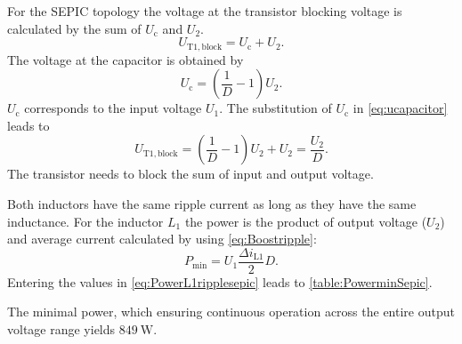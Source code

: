\begin{solutionblock}
    For the SEPIC topology the voltage at the transistor blocking voltage is calculated by the sum of 
    $U_\mathrm{c}$ and $U_\mathrm{2}$.
    \begin{equation}
        U_\mathrm{T1,block}=U_\mathrm{c}+U_\mathrm{2}.
    \end{equation}
    The voltage at the capacitor is obtained by
    \begin{equation}
        U_\mathrm{c}=\left( \frac{1}{D}-1\right) U_\mathrm{2}.
        \label{eq:ucapacitor}        
    \end{equation}
    $U_\mathrm{c}$ corresponds to the input voltage $U_\mathrm{1}$. The substitution of $U_\mathrm{c}$ in \eqref{eq:ucapacitor} leads to 
    \begin{equation}
        U_\mathrm{T1,block}=\left( \frac{1}{D}-1\right) U_\mathrm{2}+U_\mathrm{2}=\frac{U_\mathrm{2}}{D}.
    \end{equation}
    The transistor needs to block the sum of input and output voltage.
\end{solutionblock}



\begin{solutionblock}
    Both inductors have the same ripple current as long as they have the same inductance.
    For the inductor $L_1$ the power is the product of output voltage
     ($U_\mathrm{2}$) and average current calculated by using \eqref{eq:Boostripple}:
    \begin{equation}
        P_\mathrm{min}=U_\mathrm{1}\frac{\Delta i_\mathrm{L1}}{2}D.
        \label{eq:PowerL1ripplesepic}
    \end{equation}
    Entering the values in \eqref{eq:PowerL1ripplesepic} leads to \autoref{table:PowerminSepic}.
    
    The minimal power, which ensuring continuous operation across the entire output voltage range
    yields  $\SI{849}{\watt}$.

\end{solutionblock}

